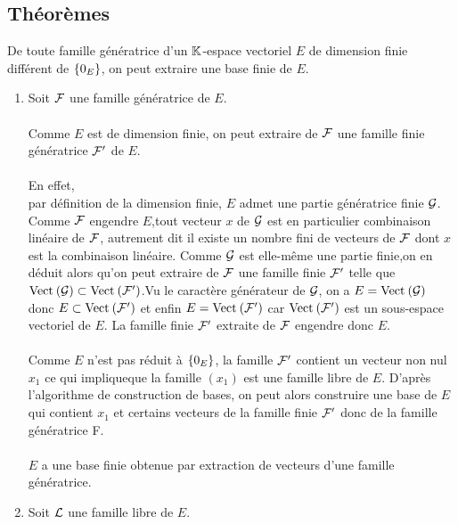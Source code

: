 \subsection{Théorèmes}
\begin{theo}
    De toute famille génératrice d’un \(\K\)-espace vectoriel \(E\) de dimension finie différent de \(\accol{0_E}\), on peut extraire une base finie de \(E\).
\end{theo}
\begin{dem}
    \begin{enumerate}
        \item Soit \(\cal{F}\) une famille génératrice de \(E\).\\~\\
        Comme \(E\) est de dimension finie, on peut extraire de \(\cal{F}\) une famille finie génératrice \(\cal{F}'\) de \(E\).\\~\\
        En effet,\\
        par définition de la dimension finie, \(E\) admet une partie génératrice finie \(\cal{G}\). Comme \(\cal{F}\) engendre \(E\),tout vecteur \(x\) de \(\cal{G}\) est en particulier combinaison linéaire de \(\cal{F}\), autrement dit il existe un nombre fini de vecteurs de \(\cal{F}\) dont \(x\) est la combinaison linéaire. Comme \(\cal{G}\) est elle-même une partie finie,on en déduit alors qu’on peut extraire de \(\cal{F}\) une famille finie \(\cal{F}'\) telle que \(\Vect{\cal{G}} \subset \Vect{\cal{F}'}\).Vu le caractère générateur de \(\cal{G}\), on a \(E = \Vect{\cal{G}}\) donc \(E \subset \Vect{\cal{F}'}\) et enfin \(E = \Vect{\cal{F}'}\) car \(\Vect{\cal{F}'}\) est un sous-espace vectoriel de \(E\). La famille finie \(\cal{F}'\) extraite de \(\cal{F}\) engendre donc \(E\).\\~\\
        Comme \(E\) n’est pas réduit à \(\accol{0_E }\), la famille \(\cal{F}'\) contient un vecteur non nul \(x_1\) ce qui impliqueque la famille \((x_1)\) est une famille libre de \(E\). D’après l’algorithme de construction de bases, on peut alors construire une base de \(E\) qui contient \( x_1\) et certains vecteurs de la famille finie \(\cal{F}'\) donc de la famille génératrice F.\\~\\
        \conclusion \(E\) a une base finie obtenue par extraction de vecteurs d’une famille génératrice.
        \item Soit \(\cal{L}\) une famille libre de \(E\).\\

\end{enumerate}
\end{dem}

